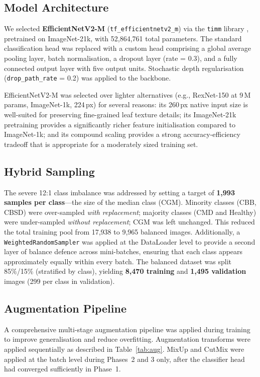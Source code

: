 \documentclass[12pt,a4paper]{article}
\begin{document}
\subsection{Model Architecture}

We selected \textbf{EfficientNetV2-M} (\texttt{tf\_efficientnetv2\_m}) via the \texttt{timm} library \cite{timm}, pretrained on ImageNet-21k, with 52,864,761 total parameters. The standard classification head was replaced with a custom head comprising a global average pooling layer, batch normalisation, a dropout layer (rate = 0.3), and a fully connected output layer with five output units. Stochastic depth regularisation (\texttt{drop\_path\_rate} = 0.2) was applied to the backbone.

EfficientNetV2-M was selected over lighter alternatives (e.g., RexNet-150 at 9\,M params, ImageNet-1k, 224\,px) for several reasons: its 260\,px native input size is well-suited for preserving fine-grained leaf texture details; its ImageNet-21k pretraining provides a significantly richer feature initialisation compared to ImageNet-1k; and its compound scaling provides a strong accuracy-efficiency tradeoff that is appropriate for a moderately sized training set.

\subsection{Hybrid Sampling}
\label{sec:sampling}

The severe 12:1 class imbalance was addressed by setting a target of \textbf{1,993 samples per class}---the size of the median class (CGM). Minority classes (CBB, CBSD) were over-sampled \textit{with replacement}; majority classes (CMD and Healthy) were under-sampled \textit{without replacement}; CGM was left unchanged. This reduced the total training pool from 17,938 to 9,965 balanced images. Additionally, a \texttt{WeightedRandomSampler} was applied at the DataLoader level to provide a second layer of balance defence across mini-batches, ensuring that each class appears approximately equally within every batch. The balanced dataset was split 85\%/15\% (stratified by class), yielding \textbf{8,470 training} and \textbf{1,495 validation} images (299 per class in validation).

\subsection{Augmentation Pipeline}

A comprehensive multi-stage augmentation pipeline was applied during training to improve generalisation and reduce overfitting. Augmentation transforms were applied sequentially as described in Table~\ref{tab:aug}. MixUp and CutMix were applied at the batch level during Phases~2 and 3 only, after the classifier head had converged sufficiently in Phase~1.
\end{document}
